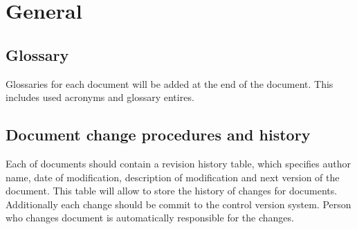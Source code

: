 \chapter{General} \label{chp:general}
	\begin{comment}
		Introduce the following subordinate sections. This section includes the Glossary and document change
		procedures.
	\end{comment}

\section{Glossary} \label{s:general:glossary}
	\begin{comment}
		Provide an alphabetical list of terms that may require definition for the users of the MTP with their
		corresponding definitions. This includes acronyms. There may also be a reference to a project glossary,
		possibly posted online.
	\end{comment}
	Glossaries for each document will be added at the end of the document. This includes used acronyms and glossary entires.
\section{Document change procedures and history} \label{s:general:document-change-procedures-and-history}
	\begin{comment}
		Specify the means for identifying, approving, implementing, and recording changes to the MTP. This
		may be recorded in an overall configuration management system that is documented in a Configuration
		Management Plan that is referenced here. The change procedures need to include a log of all of the
		changes that have occurred since the inception of the MTP. This may include a Document ID (every
		testing document should have a unique ID connected to the system project), version number
		(sequential starting with first approved version), description of document changes, reason for changes
		(e.g., audit comments, team review, system changes), name of person making changes, and role of
		person to document (e.g., document author, project manager, system owner). This information is
		commonly put on an early page in the document (after the title page and before Section 1). Some
		organizations put this information at the end of the document.
	\end{comment}
	
	Each of documents should contain a revision history table, which specifies author name, date of modification, description of modification and next version of the document. This table will allow to store the history of changes for documents. Additionally each change should be commit to the control version system. Person who changes document is automatically responsible for the changes.